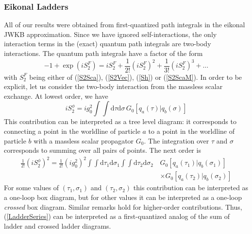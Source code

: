 \subsubsection{Eikonal Ladders}
All of our results were obtained from first-quantized path integrals in the eikonal JWKB approximation. Since we have ignored self-interactions, the only interaction terms in the (exact) quantum path integrals are two-body interactions. The quantum path integrals have a factor of the form
\begin{equation}
	{-1} + \exp{(i S_{2}^{F})} = i S_{2}^{F} + \frac{1}{2!} (i S_{2}^{F})^{2} + \frac{1}{3!} (i S_{2}^{F})^{3} + \ldots \label{LadderSeries}
\end{equation}
with $S_{2}^{F}$ being either of (\ref{S2Sca}), (\ref{S2Vec}), (\ref{Sh}) or (\ref{S2ScaM}). In order to be explicit, let us consider the two-body interaction from the massless scalar exchange. At lowest order, we have
\begin{equation}
	i S_{2}^{\phi} = i g_{0}^{2} \int \int \mathrm{d}\tau \mathrm{d}\sigma \, G_{0}[q_{a}(\tau) | q_{b}(\sigma)]
\end{equation}
This contribution can be interpreted as a tree level diagram: it corresponds to connecting a point in the worldline of particle $a$ to a point in the worldline of particle $b$ with a massless scalar propagator $G_{0}$. The integration over $\tau$ and $\sigma$ corresponds to summing over all pairs of points. The next order is
\begin{equation}
\begin{split}
	\frac{1}{2!} (i S_{2}^{\phi})^{2} = \frac{1}{2!} (i g_{0}^{2})^{2} \int \int \mathrm{d}\tau_{1} \mathrm{d} \sigma_{1} \int \int \mathrm{d} \tau_{2} \mathrm{d} \sigma_{2} \, {}& G_{0}[q_{a}(\tau_{1}) | q_{b}(\sigma_{1})] \\
	&\times G_{0}[q_{a}(\tau_{2}) | q_{b}(\sigma_{2})]
\end{split}
\end{equation}
For some values of $(\tau_{1}, \sigma_{1})$ and $(\tau_{2}, \sigma_{2})$ this contribution can be interpreted as a one-loop box diagram, but for other values it can be interpreted as a one-loop \textit{crossed} box diagram. Similar remarks hold for higher-order contributions. Thus, (\ref{LadderSeries}) can be interpreted as a first-quantized analog of the sum of ladder and crossed ladder diagrams.

